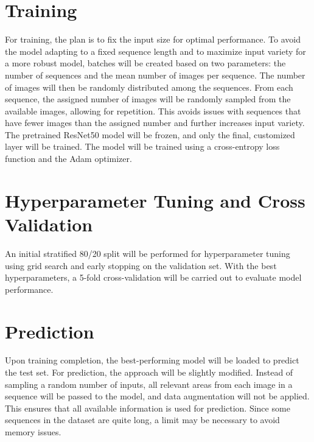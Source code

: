 \documentclass{article}
\begin{document}
\section*{Training} %

For training, the plan is to fix the input size for optimal performance. To avoid the model adapting to
a fixed sequence length and to maximize input variety for a more robust model, batches will be created based on two 
parameters: the number of sequences and the mean number of images per sequence. The number of images will then be randomly
distributed among the sequences. From each sequence, the assigned number of images will be randomly sampled
from the available images, allowing for repetition. This avoids issues with sequences that have fewer images than the
assigned number and further increases input variety. The pretrained ResNet50 model will be frozen, and only
the final, customized layer will be trained. The model will be trained using a cross-entropy loss function and the
Adam optimizer.

\section*{Hyperparameter Tuning and Cross Validation} %

An initial stratified 80/20 split will be performed for hyperparameter tuning using grid search and early stopping
on the validation set. With the best hyperparameters, a 5-fold cross-validation will be carried out to
evaluate model performance.

\section*{Prediction} %

Upon training completion, the best-performing model will be loaded to predict the test set.
For prediction, the approach will be slightly modified. Instead of sampling a random number of inputs, all relevant areas
from each image in a sequence will be passed to the model, and data augmentation will not be applied.
This ensures that all available information is used for prediction. Since some sequences in the dataset
are quite long, a limit may be necessary to avoid memory issues.



\printbibliography
\end{document}
